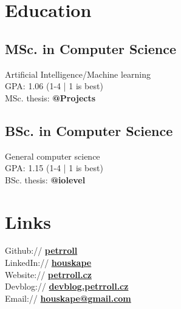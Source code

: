 \documentclass[a4paper]{deedy-resume} %
\begin{document}
\begin{minipage}[t]{0.33\textwidth} %


\section{Education} 

\subsection{MSc. in Computer Science}
Artificial Intelligence/Machine learning \\
GPA: 1.06 (1-4 | 1 is best) \\
MSc. thesis: {\bf @Projects}

\halfsectionspace %

\subsection{BSc. in Computer Science}
General computer science \\
GPA: 1.15 (1-4 | 1 is best) \\
BSc. thesis: {\bf @iolevel}

\sectionspace %


\section{Links} 

Github:// \href{https://github.com/petrroll}{\bf petrroll} \\
LinkedIn:// \href{https://www.linkedin.com/in/houskape}{\bf houskape} \\
Website:// \href{https://www.petrroll.cz}{\bf petrroll.cz} \\
Devblog:// \href{https://devblog.petrroll.cz/}{\bf devblog.petrroll.cz} \\
Email:// \href{mailto:houskape@gmail.com}{\bf houskape@gmail.com} \\


\end{minipage}
\end{document}

